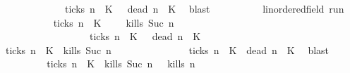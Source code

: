 \begin{isabellebody}
\ \ \ \ \ \ \ \ \ \ \ \ {\isasymunion}\ {\isacharbraceleft}{\isasymrho}{\isachardot}\ {\isacharquery}ticks\ n\ {\isasymrho}\ K\ {\isasyminter}\ {\isacharbraceleft}{\isasymrho}{\isachardot}\ {\isacharquery}dead\ n\ {\isasymrho}\ K\ \isamarkupfalse%
\ blast\isanewline
\ \ \isamarkupfalse%
\isanewline
\ \ \ \ \isacommand{{\isacharbraceleft}}\isamarkupfalse%
\ \isamarkupfalse%
\ {\isasymrho}{\isacharcolon}{\isacharcolon}{\isacartoucheopen}{\isacharprime}{\isasymtau}{\isacharcolon}{\isacharcolon}linordered{\isacharunderscore}field\ run{\isacartoucheclose}\isanewline
\ \ \ \ \ \ \isamarkupfalse%
\ {\isacartoucheopen}{\isasymrho}\ {\isasymin}\ {\isacharparenleft}{\isacharbraceleft}{\isasymrho}{\isachardot}\ {\isasymnot}\ {\isacharquery}ticks\ n\ {\isasymrho}\ K\ \ {\isasyminter}\ {\isacharbraceleft}\ {\isasymrho}{\isachardot}\ {\isacharquery}kills\ {\isacharparenleft}Suc\ n{\isacharparenright}\ {\isasymrho}{\isacharbraceright}{\isacharparenright}\isanewline
\ \ \ \ \ \ \ \ \ \ \ \ \ \ \ \ \ {\isasymunion}\ {\isacharparenleft}{\isacharbraceleft}{\isasymrho}{\isachardot}\ {\isacharquery}ticks\ n\ {\isasymrho}\ K\ {\isasyminter}\ {\isacharbraceleft}{\isasymrho}{\isachardot}\ {\isacharquery}dead\ n\ {\isasymrho}\ K\isanewline
\ \ \ \ \ \ \isamarkupfalse%
\ {\isacartoucheopen}{\isasymnot}\ {\isacharquery}ticks\ n\ {\isasymrho}\ K\ {\isasymand}\ {\isacharquery}kills\ {\isacharparenleft}Suc\ n{\isacharparenright}\ {\isasymrho}\isanewline
\ \ \ \ \ \ \ \ \ \ \ \ \ {\isasymor}\ {\isacharquery}ticks\ n\ {\isasymrho}\ K\ {\isasymand}\ {\isacharquery}dead\ n\ {\isasymrho}\ K\ \isamarkupfalse%
\ blast\isanewline
\ \ \ \ \ \ \isamarkupfalse%
\ \isamarkupfalse%
\ {\isacartoucheopen}{\isacharparenleft}{\isacharparenleft}{\isasymnot}\ {\isacharquery}ticks\ n\ {\isasymrho}\ K\ {\isasymand}\ {\isacharparenleft}{\isacharquery}kills\ {\isacharparenleft}Suc\ n{\isacharparenright}\ {\isasymrho}{\isacharparenright}{\isacharparenright}\ {\isasymlongrightarrow}\ {\isacharquery}kills\ n\ {\isasymrho}{\isacartoucheclose}\isanewline

\end{isabellebody}
